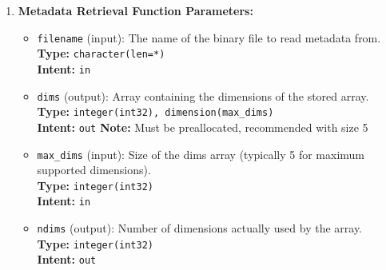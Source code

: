 \documentclass[11pt]{article}
\begin{document}
\begin{enumerate}
\begin{enumerate}
\begin{itemize}
	      	      	\item \texttt{ierr} (output): Error code indicating operation status.
	      	      	      \\ \textbf{Type:} \texttt{integer(int32)} \\ \textbf{Intent:} \texttt{out}
	      	      	      \\ \textbf{Values:} 0 indicates success, non-zero values indicate
	      	      	      specific error conditions
	      	      \end{itemize}
	      	      \begin{lstlisting}[language=Fortran, caption={Example usage of a serialize function}]
call serialize_int_2d(array, "test_file.bin", ierr)
	      	      \end{lstlisting}
	      	      
	      	\item \textbf{Metadata Retrieval Function Parameters:}
	      	      \begin{itemize}
	      	      	\item \texttt{filename} (input): The name of the binary file to read
	      	      	      metadata from. \\ \textbf{Type:} \texttt{character(len=*)} \\
	      	      	      \textbf{Intent:} \texttt{in}
	      	      	      
	      	      	\item \texttt{dims} (output): Array containing the dimensions of the
	      	      	      stored array. \\ \textbf{Type:} \texttt{integer(int32), dimension(max\_dims)}
	      	      	      \\ \textbf{Intent:} \texttt{out} \textbf{Note:} Must be preallocated,
	      	      	      recommended with size 5
	      	      	      
	      	      	\item \texttt{max\_dims} (input): Size of the dims array (typically
	      	      	      5 for maximum supported dimensions). \\ \textbf{Type:} \texttt{integer(int32)}
	      	      	      \\ \textbf{Intent:} \texttt{in}
	      	      	      
	      	      	\item \texttt{ndims} (output): Number of dimensions actually used by
	      	      	      the array. \\ \textbf{Type:} \texttt{integer(int32)} \\ \textbf{Intent:}
	      	      	      \texttt{out}
	      	      	      

\end{itemize}
\end{enumerate}
\end{enumerate}
\end{document}
